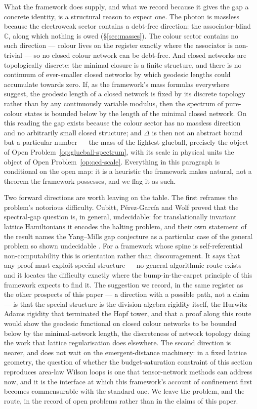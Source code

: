 What the framework does supply, and what we record because it gives the gap a concrete identity, is
a structural reason to expect one. The photon is massless because the electroweak sector contains a
debt-free direction: the associator-blind $\mathbb{C}$, along which nothing is owed
(\S\ref{sec:masses}). The colour sector contains no such direction --- colour lives on the register
exactly where the associator is non-trivial --- so no closed colour network can be debt-free. And
closed networks are topologically discrete: the minimal closure is a finite structure, and there is
no continuum of ever-smaller closed networks by which geodesic lengths could accumulate towards
zero. If, as the framework's mass formulas everywhere suggest, the geodesic length of a closed
network is fixed by its discrete topology rather than by any continuously variable modulus, then the
spectrum of pure-colour states is bounded below by the length of the minimal closed network. On this
reading the gap exists because the colour sector has no massless direction and no arbitrarily small
closed structure; and $\Delta$ is then not an abstract bound but a particular number --- the mass of
the lightest glueball, precisely the object of Open Problem~\ref{op:glueball-spectrum}, with its
scale in physical units the object of Open Problem~\ref{op:qcd-scale}. Everything in this paragraph
is conditional on the open map: it is a heuristic the framework makes natural, not a theorem the
framework possesses, and we flag it as such.

Two forward directions are worth leaving on the table. The first reframes the problem's notorious
difficulty. Cubitt, P\'{e}rez-Garc\'{i}a and Wolf proved that the spectral-gap question is, in
general, undecidable: for translationally invariant lattice Hamiltonians it encodes the halting
problem, and their own statement of the result names the Yang--Mills gap conjecture as a particular
case of the general problem so shown undecidable \autocite{cubitt2015spectralgap}. For a framework
whose spine is self-referential non-computability this is orientation rather than discouragement.
It says that any proof must exploit special structure --- no general algorithmic route exists ---
and it locates the difficulty exactly where the bump-in-the-carpet principle of this framework
expects to find it. The suggestion we record, in the same register as the other prospects of this
paper --- a direction with a possible path, not a claim --- is that the special structure is the
division-algebra rigidity itself, the Hurwitz--Adams rigidity that terminated the Hopf tower, and
that a proof along this route would show the geodesic functional on closed colour networks to be
bounded below by the minimal-network length, the discreteness of network topology doing the work
that lattice regularisation does elsewhere. The second direction is nearer, and does not wait on the
emergent-distance machinery: in a fixed lattice geometry, the question of whether the
budget-saturation constraint of this section reproduces area-law Wilson loops is one that
tensor-network methods can address now, and it is the interface at which this framework's account of
confinement first becomes commensurable with the standard one. We leave the problem, and the route,
in the record of open problems rather than in the claims of this paper.
